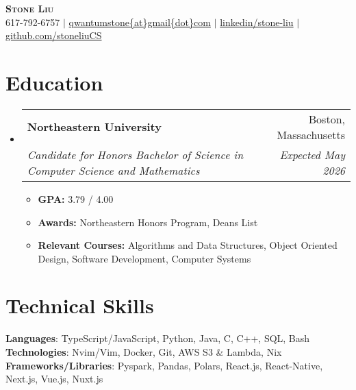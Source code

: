 \documentclass[letterpaper,10.95pt]{article}
\makeatletter
\newcommand{\resumeItem}[1]{
  \item\small{
    {#1 \vspace{-2pt}}
  }
}
\newcommand{\resumeSubheading}[4]{
  \vspace{-2pt}\item
    \begin{tabular*}{0.97\textwidth}[t]{l@{\extracolsep{\fill}}r}
      \textbf{#1} & #2 \\
      \textit{\small#3} & \textit{\small #4} \\
    \end{tabular*}\vspace{-7pt}
}
\newcommand{\resumeSubHeadingListStart}{\begin{itemize}[leftmargin=0.15in, label={}]}
\newcommand{\resumeSubHeadingListEnd}{\end{itemize}}
\newcommand{\resumeItemListStart}{\begin{itemize}}
\newcommand{\resumeItemListEnd}{\end{itemize}\vspace{-5pt}}
\makeatother
\begin{document}

\begin{center}
	\textbf{\Huge \scshape Stone Liu} \\ \vspace{3pt}
	\small 617-792-6757 $|$ \href{mailto:qwantumstone@gmail.com}{qwantumstone\{at\}gmail\{dot\}com} $|$
	\href{https://linkedin.com/in/stone-liu}{linkedin/stone-liu} $|$
	\href{https://stoneliucs.github.io/}{github.com/stoneliuCS}
\end{center}


\section{Education}
\resumeSubHeadingListStart
\resumeSubheading
{Northeastern University}{Boston, Massachusetts}
{Candidate for Honors Bachelor of Science in Computer Science and Mathematics}{Expected May 2026}
\resumeItemListStart
\resumeItem{\textbf{GPA:} 3.79 / 4.00 }
\resumeItem{\textbf{Awards:} Northeastern Honors Program, Deans List }
\resumeItem{\textbf{Relevant Courses:} Algorithms and Data Structures, Object Oriented Design, Software Development, Computer Systems}
\resumeItemListEnd
\resumeSubHeadingListEnd

%
\section{Technical Skills}
\begin{itemize}[leftmargin=0.15in, label={}]
	\small{\item{
	      \textbf{Languages}{: TypeScript/JavaScript, Python, Java, C, C++, SQL, Bash } \\
        \textbf{Technologies}{: Nvim/Vim, Docker, Git, AWS S3 \& Lambda, Nix } \\
        \textbf{Frameworks/Libraries}{: Pyspark, Pandas, Polars, React.js, React-Native, Next.js, Vue.js, Nuxt.js}}}
\end{itemize}
\end{document}
